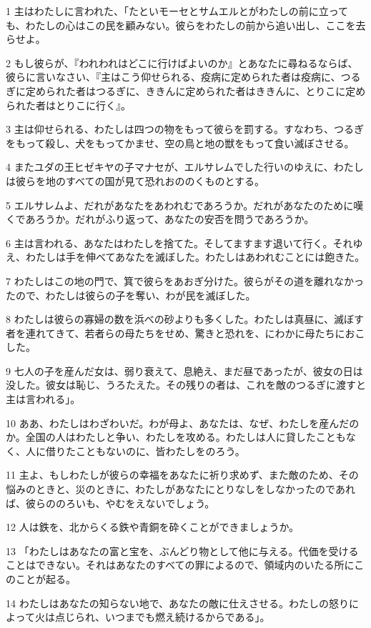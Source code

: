 \par 1 主はわたしに言われた、「たといモーセとサムエルとがわたしの前に立っても、わたしの心はこの民を顧みない。彼らをわたしの前から追い出し、ここを去らせよ。
\par 2 もし彼らが、『われわれはどこに行けばよいのか』とあなたに尋ねるならば、彼らに言いなさい、『主はこう仰せられる、疫病に定められた者は疫病に、つるぎに定められた者はつるぎに、ききんに定められた者はききんに、とりこに定められた者はとりこに行く』。
\par 3 主は仰せられる、わたしは四つの物をもって彼らを罰する。すなわち、つるぎをもって殺し、犬をもってかませ、空の鳥と地の獣をもって食い滅ぼさせる。
\par 4 またユダの王ヒゼキヤの子マナセが、エルサレムでした行いのゆえに、わたしは彼らを地のすべての国が見て恐れおののくものとする。
\par 5 エルサレムよ、だれがあなたをあわれむであろうか。だれがあなたのために嘆くであろうか。だれがふり返って、あなたの安否を問うであろうか。
\par 6 主は言われる、あなたはわたしを捨てた。そしてますます退いて行く。それゆえ、わたしは手を伸べてあなたを滅ぼした。わたしはあわれむことには飽きた。
\par 7 わたしはこの地の門で、箕で彼らをあおぎ分けた。彼らがその道を離れなかったので、わたしは彼らの子を奪い、わが民を滅ぼした。
\par 8 わたしは彼らの寡婦の数を浜べの砂よりも多くした。わたしは真昼に、滅ぼす者を連れてきて、若者らの母たちをせめ、驚きと恐れを、にわかに母たちにおこした。
\par 9 七人の子を産んだ女は、弱り衰えて、息絶え、まだ昼であったが、彼女の日は没した。彼女は恥じ、うろたえた。その残りの者は、これを敵のつるぎに渡すと主は言われる」。
\par 10 ああ、わたしはわざわいだ。わが母よ、あなたは、なぜ、わたしを産んだのか。全国の人はわたしと争い、わたしを攻める。わたしは人に貸したこともなく、人に借りたこともないのに、皆わたしをのろう。
\par 11 主よ、もしわたしが彼らの幸福をあなたに祈り求めず、また敵のため、その悩みのときと、災のときに、わたしがあなたにとりなしをしなかったのであれば、彼らののろいも、やむをえないでしょう。
\par 12 人は鉄を、北からくる鉄や青銅を砕くことができましょうか。
\par 13 「わたしはあなたの富と宝を、ぶんどり物として他に与える。代価を受けることはできない。それはあなたのすべての罪によるので、領域内のいたる所にこのことが起る。
\par 14 わたしはあなたの知らない地で、あなたの敵に仕えさせる。わたしの怒りによって火は点じられ、いつまでも燃え続けるからである」。
